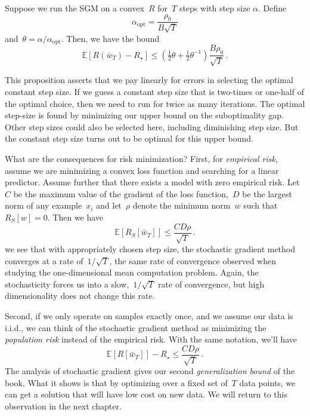 \documentclass{tufte-book}
\begin{document}
\begin{Theorem}

Suppose we run the SGM on a convex~\(R\) for~\(T\) steps with step size
\(\alpha\). Define \[
    \alpha_{\mathrm{opt}} = \frac{\rho_0}{B\sqrt{T}}
\] and~\(\theta = \alpha/\alpha_{\mathrm{opt}}.\) Then, we have the
bound \[
\mathbb{E}[R(\bar{w}_T) - R_\star] \leq \left(\tfrac{1}{2} \theta + \tfrac{1}{2} \theta^{-1}\right) \frac{B \rho_0}{\sqrt{T}}  \,.
\]

\end{Theorem}

This proposition asserts that we pay linearly for errors in selecting
the optimal constant step size. If we guess a constant step size that is
two-times or one-half of the optimal choice, then we need to run for
twice as many iterations. The optimal step-size is found by minimizing
our upper bound on the suboptimality gap. Other step sizes could also be
selected here, including diminishing step size. But the constant step
size turns out to be optimal for this upper bound.

What are the consequences for risk minimization? First, for
\emph{empirical risk}, assume we are minimizing a convex loss function
and searching for a linear predictor. Assume further that there exists a
model with zero empirical risk. Let~\(C\) be the maximum value of the
gradient of the loss function,~\(D\) be the largest norm of any
example~\(x_i\) and let~\(\rho\) denote the minimum norm~\(w\) such
that~\(R_S[w]=0\). Then we have \[
\mathbb{E}[R_S[\bar{w}_T]] \leq \frac{CD\rho}{\sqrt{T}}  \,.
\] we see that with appropriately chosen step size, the stochastic
gradient method converges at a rate of~\(1/\sqrt{T}\), the same rate of
convergence observed when studying the one-dimensional mean computation
problem. Again, the stochasticity forces us into a slow,~\(1/\sqrt{T}\)
rate of convergence, but high dimensionality does not change this rate.

Second, if we only operate on samples exactly once, and we assume our
data is i.i.d., we can think of the stochastic gradient method as
minimizing the \emph{population risk} instead of the empirical risk.
With the same notation, we'll have \[
\mathbb{E}[R[\bar{w}_T]] -R_\star \leq \frac{CD\rho}{\sqrt{T}}  \,.
\] The analysis of stochastic gradient gives our second
\emph{generalization bound} of the book. What it shows is that by
optimizing over a fixed set of~\(T\) data points, we can get a solution
that will have low cost on new data. We will return to this observation
in the next chapter.
\end{document}
